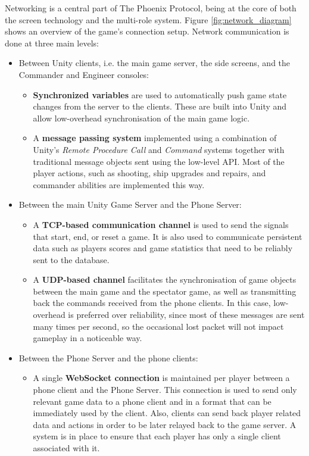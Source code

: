 \documentclass[a4paper,11pt]{article}
\begin{document}
Networking is a central part of The Phoenix Protocol, being at the core of both the screen technology and the multi-role system. Figure \ref{fig:network_diagram} shows an overview of the game's connection setup. Network communication is done at three main levels:

\begin{itemize}
	\item Between Unity clients, i.e. the main game server, the side screens, and the Commander and Engineer consoles:
    
	\begin{itemize}[topsep=0ex]
      \item \textbf{Synchronized variables} are used to automatically push game state changes from the server to the clients. These are built into Unity and allow low-overhead synchronisation of the main game logic.
      \item A \textbf{message passing system} implemented using a combination of Unity’s  \emph{Remote Procedure Call} and \emph{Command} systems together with traditional message objects sent using the low-level API. Most of the player actions, such as shooting, ship upgrades and repairs, and commander abilities are implemented this way.
  	\end{itemize}
    
	\item Between the main Unity Game Server and the Phone Server:
    
  \begin{itemize}[topsep=0ex]
 	 \item A \textbf{TCP-based communication channel} is used to send the signals that start, end, or reset a game. It is also used to communicate persistent data such as players scores and game statistics that need to be reliably sent to the database.
 	 \item A \textbf{UDP-based channel} facilitates the synchronisation of game objects between the main game and the spectator game, as well as transmitting back the commands received from the phone clients. In this case, low-overhead is preferred over reliability, since most of these messages are sent many times per second, so the occasional lost packet will not impact gameplay in a noticeable way.
  \end{itemize}
  
\item Between the Phone Server and the phone clients:

  \begin{itemize}[topsep=0ex]
  	\item A single \textbf{WebSocket connection} is maintained per player between a phone client and the Phone Server. This connection is used to send only relevant game data to a phone client and in a format that can be immediately used by the client. Also, clients can send back player related data and actions in order to be later relayed back to the game server. A system is in place to ensure that each player has only a single client associated with it.
  \end{itemize}
  
\end{itemize}
\end{document}
